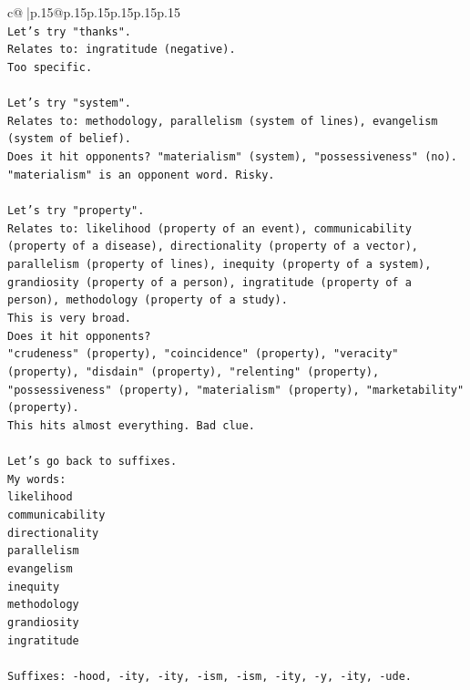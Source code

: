 \documentclass{article}
\begin{document}
{\begin{supertabular}{c@{$\;$}|p{.15\linewidth}@{}p{.15\linewidth}p{.15\linewidth}p{.15\linewidth}p{.15\linewidth}p{.15\linewidth}}
{{{\\ 
\texttt{Let's try "thanks".} \\
\texttt{Relates to: ingratitude (negative).} \\
\texttt{Too specific.} \\
\\ 
\texttt{Let's try "system".} \\
\texttt{Relates to: methodology, parallelism (system of lines), evangelism (system of belief).} \\
\texttt{Does it hit opponents? "materialism" (system), "possessiveness" (no).} \\
\texttt{"materialism" is an opponent word. Risky.} \\
\\ 
\texttt{Let's try "property".} \\
\texttt{Relates to: likelihood (property of an event), communicability (property of a disease), directionality (property of a vector), parallelism (property of lines), inequity (property of a system), grandiosity (property of a person), ingratitude (property of a person), methodology (property of a study).} \\
\texttt{This is very broad.} \\
\texttt{Does it hit opponents?} \\
\texttt{"crudeness" (property), "coincidence" (property), "veracity" (property), "disdain" (property), "relenting" (property), "possessiveness" (property), "materialism" (property), "marketability" (property).} \\
\texttt{This hits almost everything. Bad clue.} \\
\\ 
\texttt{Let's go back to suffixes.} \\
\texttt{My words:} \\
\texttt{likelihood} \\
\texttt{communicability} \\
\texttt{directionality} \\
\texttt{parallelism} \\
\texttt{evangelism} \\
\texttt{inequity} \\
\texttt{methodology} \\
\texttt{grandiosity} \\
\texttt{ingratitude} \\
\\ 
\texttt{Suffixes: {-}hood, {-}ity, {-}ity, {-}ism, {-}ism, {-}ity, {-}y, {-}ity, {-}ude.} \\
}}}
\end{supertabular}}
\end{document}
